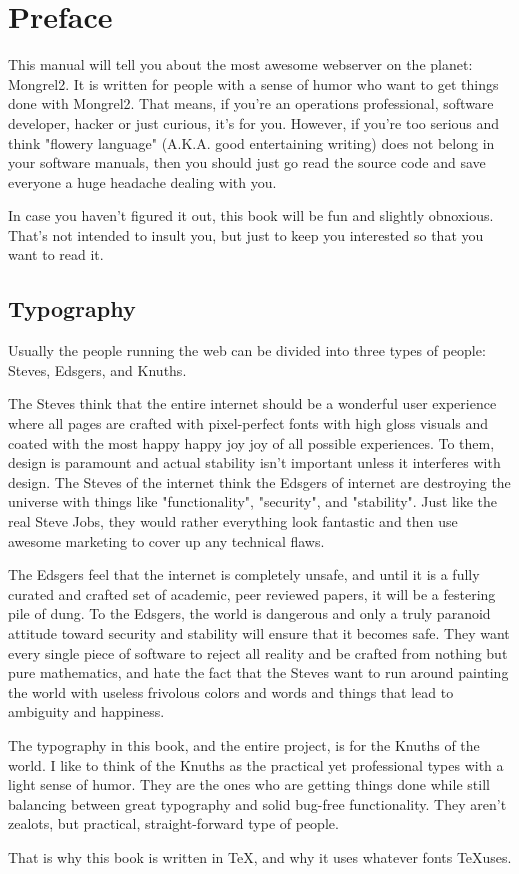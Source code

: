 \chapter{Preface}

This manual will tell you about the most awesome webserver on the planet:
Mongrel2.  It is written for people with a sense of humor who want to get
things done with Mongrel2.  That means, if you're an operations professional,
software developer, hacker or just curious, it's for you.  However, if you're
too serious and think "flowery language" (A.K.A. good entertaining writing) does
not belong in your software manuals, then you should just go read the source
code and save everyone a huge headache dealing with you.

In case you haven't figured it out, this book will be fun and slightly
obnoxious.  That's not intended to insult you, but just to keep you interested
so that you want to read it.


\section*{Typography}

Usually the people running the web can be divided into three types of people:  Steves,
Edsgers, and Knuths.

The Steves think that the entire internet should be a wonderful user experience
where all pages are crafted with pixel-perfect fonts with high gloss visuals
and coated with the most happy happy joy joy of all possible experiences.  To
them, design is paramount and actual stability isn't important unless it
interferes with design.  The Steves of the internet think the Edsgers of
internet are destroying the universe with things like "functionality",
"security", and "stability".  Just like the real Steve Jobs, they would rather
everything look fantastic and then use awesome marketing to cover up any
technical flaws.

The Edsgers feel that the internet is completely unsafe, and until it is a fully
curated and crafted set of academic, peer reviewed papers, it will be a festering
pile of dung.  To the Edsgers, the world is dangerous and only a truly paranoid
attitude toward security and stability will ensure that it becomes safe.  They
want every single piece of software to reject all reality and be crafted from
nothing but pure mathematics, and hate the fact that the Steves want to run
around painting the world with useless frivolous colors and words and things
that lead to ambiguity and happiness.

The typography in this book, and the entire project, is for the Knuths of the
world.  I like to think of the Knuths as the practical yet professional types
with a light sense of humor.  They are the ones who are getting things done
while still balancing between great typography and solid bug-free
functionality.  They aren't zealots, but practical, straight-forward type of
people.

That is why this book is written in \TeX, and why it uses whatever fonts \TeX uses.

